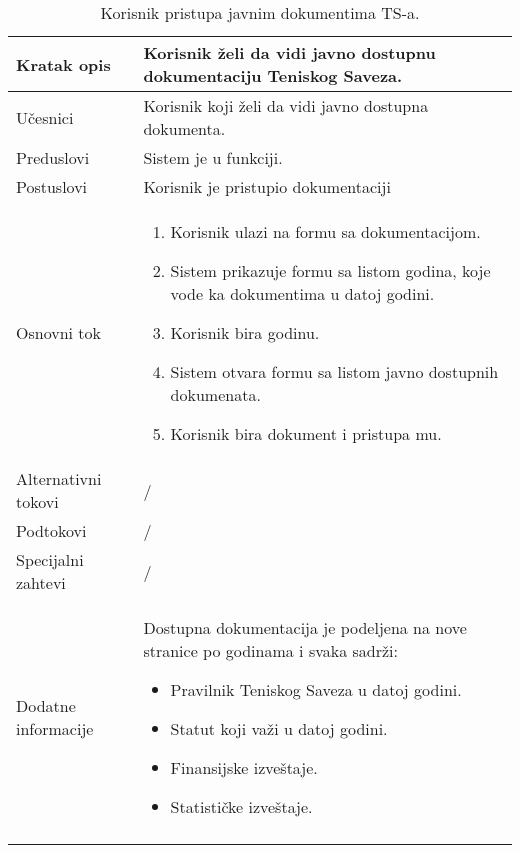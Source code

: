 \documentclass{article}
\begin{document}
        \begin{longtable}{| p{} | p{} |} 
            \hline
                Kratak opis & Korisnik želi da vidi javno dostupnu dokumentaciju Teniskog Saveza.\\
            \hline    
                Učesnici & Korisnik koji želi da vidi javno dostupna dokumenta. \\
            \hline
               Preduslovi &  Sistem je u funkciji.\\
            \hline  
                Postuslovi &  Korisnik je pristupio dokumentaciji\\
            \hline
                Osnovni tok & \begin{enumerate}
                    \item Korisnik ulazi na formu sa dokumentacijom.
                    \item Sistem prikazuje formu sa listom godina, koje vode ka dokumentima u datoj godini.
                    \item Korisnik bira godinu.
                    \item Sistem otvara formu sa listom javno dostupnih dokumenata.
                    \item Korisnik bira dokument i pristupa mu.
                \end{enumerate}\\
            \hline
                Alternativni tokovi & /\\
            \hline
                Podtokovi & /\\
            \hline
                Specijalni zahtevi & /\\
            \hline
                Dodatne informacije & Dostupna dokumentacija je podeljena na nove stranice po godinama i svaka sadrži:
                \begin{itemize}
                    \item Pravilnik Teniskog Saveza u datoj godini.
                    \item Statut koji važi u datoj godini.
                    \item Finansijske izveštaje.
                    \item Statističke izveštaje.
                \end{itemize}\\
            \hline
            \caption{Korisnik pristupa javnim dokumentima TS-a.} 
        \end{longtable}
\end{document}
